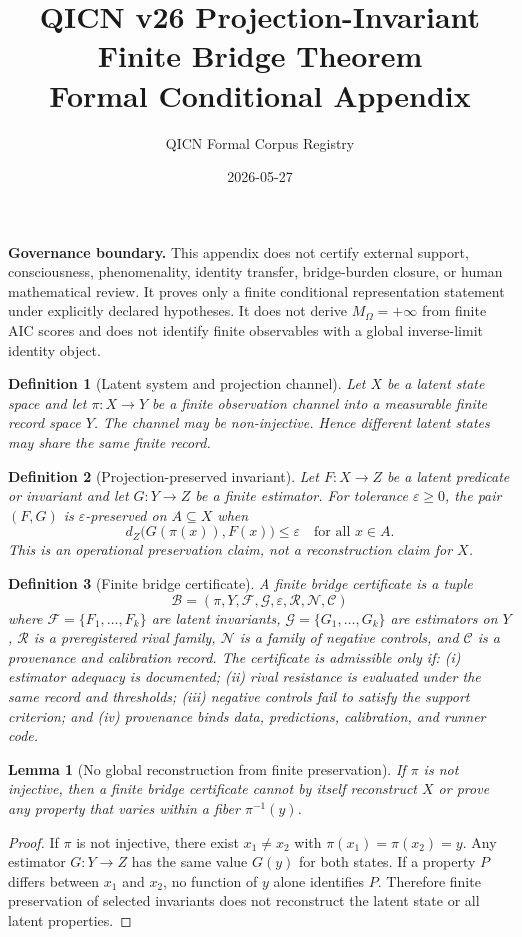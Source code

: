 \documentclass[11pt]{article}
\title{QICN v26 Projection-Invariant Finite Bridge Theorem\\\large Formal Conditional Appendix}
\author{QICN Formal Corpus Registry}
\date{2026-05-27}
\newtheorem{definition}{Definition}
\newtheorem{lemma}{Lemma}
\begin{document}
\maketitle
\noindent\textbf{Governance boundary.} This appendix does not certify external support, consciousness, phenomenality, identity transfer, bridge-burden closure, or human mathematical review. It proves only a finite conditional representation statement under explicitly declared hypotheses. It does not derive $M_{\Omega}=+\infty$ from finite AIC scores and does not identify finite observables with a global inverse-limit identity object.

\begin{definition}[Latent system and projection channel]
Let $X$ be a latent state space and let $\pi:X\to Y$ be a finite observation channel into a measurable finite record space $Y$. The channel may be non-injective. Hence different latent states may share the same finite record.
\end{definition}

\begin{definition}[Projection-preserved invariant]
Let $F:X\to Z$ be a latent predicate or invariant and let $G:Y\to Z$ be a finite estimator. For tolerance $\varepsilon\geq 0$, the pair $(F,G)$ is $\varepsilon$-preserved on $A\subseteq X$ when
\[
  d_Z\bigl(G(\pi(x)),F(x)\bigr)\leq \varepsilon \quad \text{for all } x\in A.
\]
This is an operational preservation claim, not a reconstruction claim for $X$.
\end{definition}

\begin{definition}[Finite bridge certificate]
A finite bridge certificate is a tuple
\[
  \mathcal{B}=(\pi,Y,\mathcal{F},\mathcal{G},\varepsilon,\mathcal{R},\mathcal{N},\mathcal{C})
\]
where $\mathcal{F}=\{F_1,\ldots,F_k\}$ are latent invariants, $\mathcal{G}=\{G_1,\ldots,G_k\}$ are estimators on $Y$, $\mathcal{R}$ is a preregistered rival family, $\mathcal{N}$ is a family of negative controls, and $\mathcal{C}$ is a provenance and calibration record. The certificate is admissible only if: (i) estimator adequacy is documented; (ii) rival resistance is evaluated under the same record and thresholds; (iii) negative controls fail to satisfy the support criterion; and (iv) provenance binds data, predictions, calibration, and runner code.
\end{definition}

\begin{lemma}[No global reconstruction from finite preservation]
If $\pi$ is not injective, then a finite bridge certificate cannot by itself reconstruct $X$ or prove any property that varies within a fiber $\pi^{-1}(y)$.
\end{lemma}
\begin{proof}
If $\pi$ is not injective, there exist $x_1\neq x_2$ with $\pi(x_1)=\pi(x_2)=y$. Any estimator $G:Y\to Z$ has the same value $G(y)$ for both states. If a property $P$ differs between $x_1$ and $x_2$, no function of $y$ alone identifies $P$. Therefore finite preservation of selected invariants does not reconstruct the latent state or all latent properties.
\end{proof}
\end{document}
